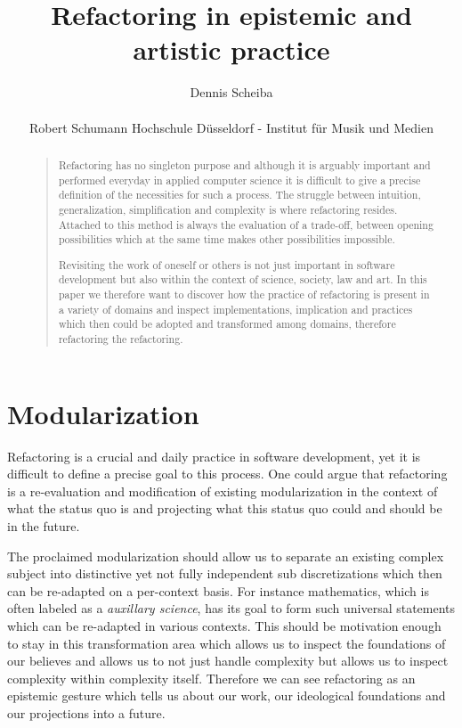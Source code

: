 \documentclass[10pt,twocolumn,letterpaper]{article}
\newcommand\email[1]{\small{\href{mailto:#1}{\color{black}{\nolinkurl{#1}}}}}
\begin{document}
\title{Refactoring in epistemic and artistic practice}

\author{Dennis Scheiba\\
\email{dennis.scheiba@rsh-duesseldorf.de}\\
Robert Schumann Hochschule Düsseldorf - Institut für Musik und Medien\\
}
\maketitle

\begin{abstract}

\begin{quote}
Refactoring has no singleton purpose and although it is arguably important and performed everyday in applied computer science it is difficult to give a precise definition of the necessities for such a process.
The struggle between intuition, generalization, simplification and complexity is where refactoring resides.
Attached to this method is always the evaluation of a trade-off, between opening possibilities which at the same time makes other possibilities impossible.

Revisiting the work of oneself or others is not just important in software development but also within the context of science, society, law and art.
In this paper we therefore want to discover how the practice of refactoring is present in a variety of domains and inspect implementations, implication and practices which then could be adopted and transformed among domains, therefore refactoring the refactoring.
\end{quote}
\end{abstract}

\vspace{-1em}

\section{Modularization}

Refactoring is a crucial and daily practice in software development, yet it is difficult to define a precise goal to this process.
One could argue that refactoring is a re-evaluation and modification of existing modularization in the context of what the status quo is and projecting what this status quo could and should be in the future.

The proclaimed modularization should allow us to separate an existing complex subject into distinctive yet not fully independent sub discretizations which then can be re-adapted on a per-context basis.
For instance mathematics, which is often labeled as a \textit{auxillary science}, has its goal to form such universal statements which can be re-adapted in various contexts.
This should be motivation enough to stay in this transformation area which allows us to inspect the foundations of our believes and allows us to not just handle complexity but allows us to inspect complexity within complexity itself.
Therefore we can see refactoring as an epistemic gesture which tells us about our work, our ideological foundations and our projections into a future.
\end{document}
